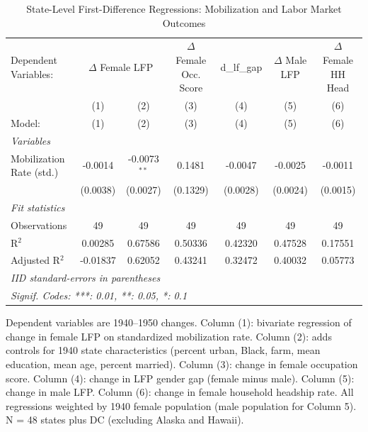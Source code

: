 
\begin{table}[htbp]
   \caption{\label{tab:main_state} State-Level First-Difference Regressions: Mobilization and Labor Market Outcomes}
   \centering
   \begin{tabular}{lcccccc}
      \tabularnewline \midrule \midrule
      Dependent Variables: & \multicolumn{2}{c}{$\Delta$ Female LFP} & $\Delta$ Female Occ. Score & d\_lf\_gap & $\Delta$ Male LFP & $\Delta$ Female HH Head\\
                               & (1)      & (2)            & (3)      & (4)      & (5)      & (6) \\   
      Model:                   & (1)      & (2)            & (3)      & (4)      & (5)      & (6)\\  
      \midrule
      \emph{Variables}\\
      Mobilization Rate (std.) & -0.0014  & -0.0073$^{**}$ & 0.1481   & -0.0047  & -0.0025  & -0.0011\\   
                               & (0.0038) & (0.0027)       & (0.1329) & (0.0028) & (0.0024) & (0.0015)\\   
      \midrule
      \emph{Fit statistics}\\
      Observations             & 49       & 49             & 49       & 49       & 49       & 49\\  
      R$^2$                    & 0.00285  & 0.67586        & 0.50336  & 0.42320  & 0.47528  & 0.17551\\  
      Adjusted R$^2$           & -0.01837 & 0.62052        & 0.43241  & 0.32472  & 0.40032  & 0.05773\\  
      \midrule \midrule
      \multicolumn{7}{l}{\emph{IID standard-errors in parentheses}}\\
      \multicolumn{7}{l}{\emph{Signif. Codes: ***: 0.01, **: 0.05, *: 0.1}}\\
   \end{tabular}
   
   \par \raggedright 
   Dependent variables are 1940--1950 changes. Column (1): bivariate regression of change in female LFP on standardized mobilization rate. Column (2): adds controls for 1940 state characteristics (percent urban, Black, farm, mean education, mean age, percent married). Column (3): change in female occupation score. Column (4): change in LFP gender gap (female minus male). Column (5): change in male LFP. Column (6): change in female household headship rate. All regressions weighted by 1940 female population (male population for Column 5). N = 48 states plus DC (excluding Alaska and Hawaii).
\end{table}


